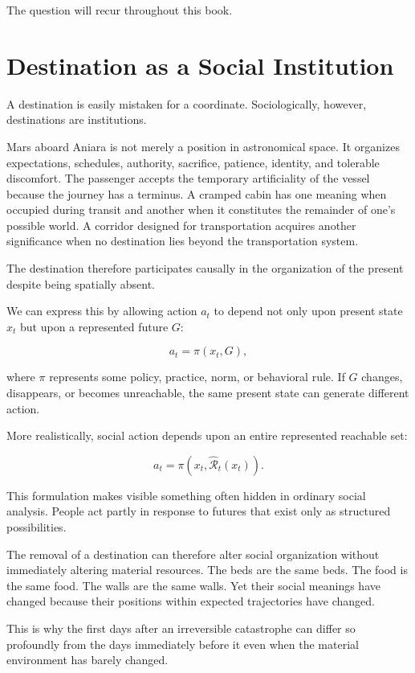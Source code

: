 \documentclass[11pt,oneside]{book}
\theoremstyle{definition}
\theoremstyle{remark}
\newcommand{\R}{\mathcal{R}}
\begin{document}
The question will recur throughout this book.

\section{Destination as a Social Institution}

A destination is easily mistaken for a coordinate. Sociologically, however, destinations are institutions.

Mars aboard Aniara is not merely a position in astronomical space. It organizes expectations, schedules, authority, sacrifice, patience, identity, and tolerable discomfort. The passenger accepts the temporary artificiality of the vessel because the journey has a terminus. A cramped cabin has one meaning when occupied during transit and another when it constitutes the remainder of one's possible world. A corridor designed for transportation acquires another significance when no destination lies beyond the transportation system.

The destination therefore participates causally in the organization of the present despite being spatially absent.

We can express this by allowing action \(a_t\) to depend not only upon present state \(x_t\) but upon a represented future \(G\):

\[
a_t
=
\pi(x_t,G),
\]

where \(\pi\) represents some policy, practice, norm, or behavioral rule. If \(G\) changes, disappears, or becomes unreachable, the same present state can generate different action.

More realistically, social action depends upon an entire represented reachable set:

\[
a_t
=
\pi\!\left(
x_t,
\widehat{\R}_t(x_t)
\right).
\]

This formulation makes visible something often hidden in ordinary social analysis. People act partly in response to futures that exist only as structured possibilities.

The removal of a destination can therefore alter social organization without immediately altering material resources. The beds are the same beds. The food is the same food. The walls are the same walls. Yet their social meanings have changed because their positions within expected trajectories have changed.

This is why the first days after an irreversible catastrophe can differ so profoundly from the days immediately before it even when the material environment has barely changed.
\end{document}
